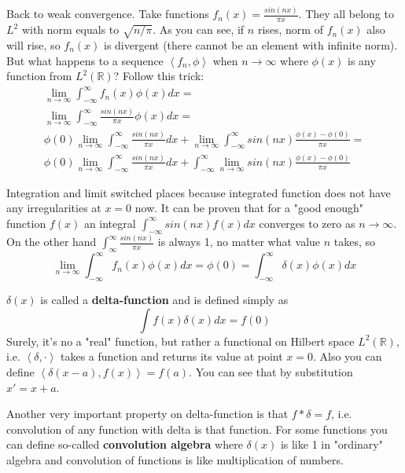 \documentclass[a4paper,11pt,fleqn]{article}
\begin{document}
Back to weak convergence. Take functions $f_{n}(x) = \frac{sin(nx)}{\pi x}$. They all belong to $L^2$ with norm equals to $\sqrt{n/\pi}$. As you can see, if
$n$ rises, norm of $f_{n}(x)$ also will rise, so $f_{n}(x)$ is divergent (there cannot be an element with infinite norm). But what happens to a sequence
$\left<f_{n},\phi\right>$ when $n \to \infty$ where $\phi(x)$ is any function from $L^2(\mathbb{R})$? Follow this trick:
\begin{equation}
\begin{aligned}
\lim_{n \to \infty} \int_{-\infty}^{\infty} f_{n}(x)\phi(x)dx = \\
\lim_{n \to \infty} \int_{-\infty}^{\infty} \frac{sin(nx)}{\pi x}\phi(x)dx = \\
\phi(0) \lim_{n \to \infty} \int_{-\infty}^{\infty} \frac{sin(nx)}{\pi x} dx + \lim_{n \to \infty} \int_{-\infty}^{\infty} sin(nx) \frac{\phi(x) - \phi(0)}{\pi x} = \\
\phi(0) \lim_{n \to \infty} \int_{-\infty}^{\infty} \frac{sin(nx)}{\pi x} dx + \int_{-\infty}^{\infty} \lim_{n \to \infty} sin(nx) \frac{\phi(x) - \phi(0)}{\pi x}
\end{aligned}
\end{equation}

Integration and limit switched places because integrated function does not have any irregularities at $x=0$ now. It can be proven that for a "good enough" function $f(x)$
an integral $\int_{-\infty}^{\infty} sin(nx) f(x)dx$ converges to zero as $n \to \infty$. On the other hand $\int_{\infty}^{\infty} \frac{sin(nx)}{\pi x}$ is always 1,
no matter what value $n$ takes, so
\begin{equation}
\lim_{n \to \infty} \int_{-\infty}^{\infty} f_{n}(x)\phi(x)dx = \phi(0) = \int_{-\infty}^{\infty} \delta(x)\phi(x)dx
\end{equation}

$\delta(x)$ is called a \textbf{delta-function} and is defined simply as
\begin{equation}
\int f(x)\delta(x) dx = f(0)
\end{equation}
Surely, it's no a "real" function, but rather a functional on Hilbert space $L^{2}(\mathbb{R})$, i.e. $\left<\delta,\cdot\right>$ takes a function and returns its value
at point $x=0$. Also you can define $\left<\delta(x-a),f(x)\right> = f(a)$. You can see that by substitution $x' = x+a$.

Another very important property on delta-function is that $f*\delta = f$, i.e. convolution of any function with delta is that function. For some functions you can define
so-called \textbf{convolution algebra} where $\delta(x)$ is like 1 in "ordinary" algebra and convolution of functions is like multiplication of numbers.
\end{document}
